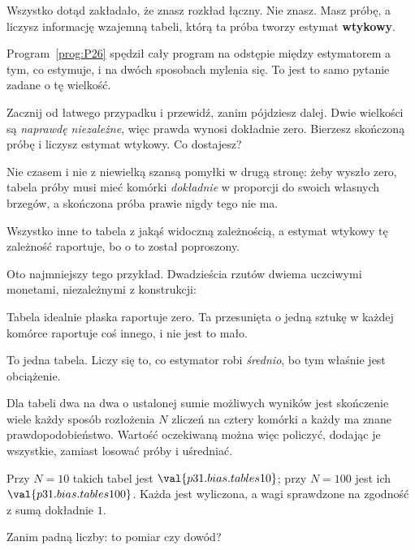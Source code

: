 \begin{fr}
Wszystko dotąd zakładało, że znasz rozkład łączny. Nie znasz. Masz próbę, a
liczysz informację wzajemną tabeli, którą ta próba tworzy \dash{} estymat
\textbf{wtykowy}.

Program~\ref{prog:P26} spędził cały program na odstępie między estymatorem a
tym, co estymuje, i na dwóch sposobach mylenia się. To jest to samo pytanie
zadane o tę wielkość.

Zacznij od łatwego przypadku i przewidź, zanim pójdziesz dalej. Dwie
wielkości są \emph{naprawdę niezależne}, więc prawda wynosi dokładnie zero.
Bierzesz skończoną próbę i liczysz estymat wtykowy. Co dostajesz?
\dotline
\nextframe
\end{fr}

\begin{fr}

Nie czasem i nie z niewielką szansą pomyłki w drugą stronę: żeby wyszło
zero, tabela próby musi mieć komórki \emph{dokładnie} w proporcji do swoich
własnych brzegów, a skończona próba prawie nigdy tego nie ma.

Wszystko inne to tabela z jakąś widoczną zależnością, a estymat wtykowy tę
zależność raportuje, bo o to został poproszony.

Oto najmniejszy tego przykład. Dwadzieścia rzutów dwiema uczciwymi monetami,
niezależnymi z konstrukcji:


Tabela idealnie płaska raportuje zero. Ta przesunięta o jedną sztukę w
każdej komórce raportuje coś innego, i nie jest to mało.
\end{fr}

\begin{fr}
To jedna tabela. Liczy się to, co estymator robi \emph{średnio}, bo tym
właśnie jest obciążenie.

Dla tabeli dwa na dwa o ustalonej sumie możliwych wyników jest skończenie
wiele \dash{} każdy sposób rozłożenia $N$ zliczeń na cztery komórki
\dash{} a każdy ma znane prawdopodobieństwo. Wartość oczekiwaną można więc
policzyć, dodając je wszystkie, zamiast losować próby i uśredniać.

Przy $N = 10$ takich tabel jest $\val{p31.bias.tables10}$; przy $N = 100$
jest ich $\val{p31.bias.tables100}$. Każda jest wyliczona, a wagi sprawdzone
na zgodność z sumą dokładnie $1$.

Zanim padną liczby: to pomiar czy dowód?
\dotline
\nextframe
\end{fr}

